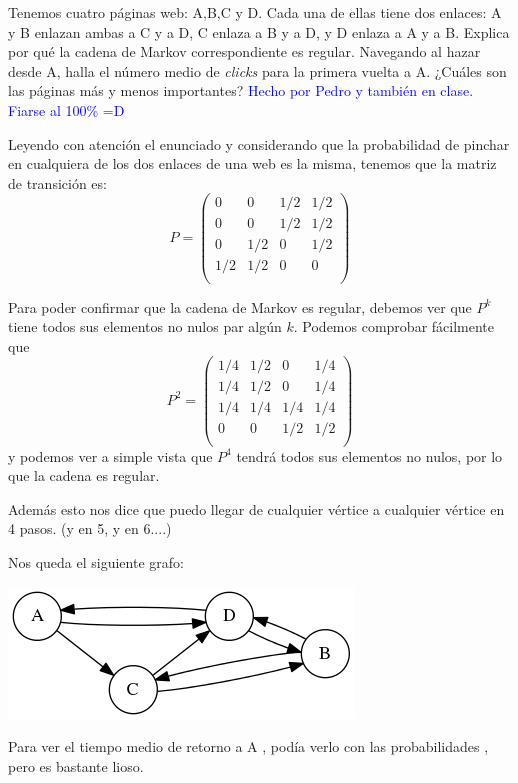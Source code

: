 \begin{problem}[6]
Tenemos cuatro páginas web: A,B,C y D. Cada una de ellas tiene dos enlaces: A y B enlazan ambas a C y a D, C enlaza a  B y a D, y D enlaza a A y a B. Explica por qué la cadena de Markov correspondiente es regular. Navegando al hazar desde A, halla el número medio de \textit{clicks} para la primera vuelta a A. ¿Cuáles son las páginas más y menos importantes?
	\solution
	\textcolor{blue}{Hecho por Pedro y también en clase. Fiarse al 100\%  =D}

	Leyendo con atención el enunciado y considerando que la probabilidad de pinchar en cualquiera de los dos enlaces de una web es la misma, tenemos que la matriz de transición es:
	\[P= \left( \begin{matrix}
	0&0&1/2&1/2\\
	0&0&1/2&1/2\\
	0&1/2&0&1/2\\
	1/2&1/2&0&0\\
	\end{matrix}\right)\]

	Para poder confirmar que la cadena de Markov es regular, debemos ver que $P^k$ tiene todos sus elementos no nulos par algún $k$. Podemos comprobar fácilmente que
	\[P^2= \left( \begin{matrix}
	1/4&1/2&0&1/4\\
	1/4&1/2&0&1/4\\
	1/4&1/4&1/4&1/4\\
	0&0&1/2&1/2\\
	\end{matrix}\right)\]
	y podemos ver a simple vista que $P^4$ tendrá todos sus elementos no nulos, por lo que la cadena es regular.

	Además esto nos dice que puedo llegar de cualquier vértice a cualquier vértice en 4 pasos. (y en 5, y en 6....)

	Nos queda el siguiente grafo:
	\begin{center}
	\includegraphics{tex/grafo_H2E6.png}
	\end{center}

Para ver el tiempo medio de retorno a A , podía verlo con las probabilidades , pero es bastante lioso.


\end{problem}

